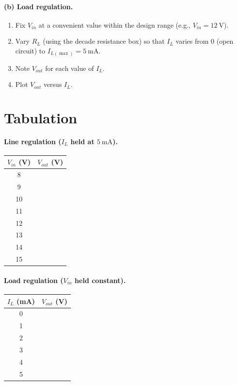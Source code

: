 \paragraph{(b) Load regulation.}
\begin{enumerate}
	\item Fix $V_{in}$ at a convenient value within the design range (e.g., $V_{in} = 12\ \text{V}$).
	\item Vary $R_L$ (using the decade resistance box) so that $I_L$ varies from $0$ (open circuit) to $I_{L(\max)} = 5\ \text{mA}$.
	\item Note $V_{out}$ for each value of $I_L$.
	\item Plot $V_{out}$ versus $I_L$.
\end{enumerate}

\section{Tabulation}

\paragraph{Line regulation ($I_L$ held at $5\ \text{mA}$).}
\begin{center}
	\begin{tabular}{@{}cc@{}}
		\toprule
		$V_{in}$ (V) & $V_{out}$ (V) \\
		\midrule
		8  & \\
		9  & \\
		10 & \\
		11 & \\
		12 & \\
		13 & \\
		14 & \\
		15 & \\
		\bottomrule
	\end{tabular}
\end{center}

\paragraph{Load regulation ($V_{in}$ held constant).}
\begin{center}
	\begin{tabular}{@{}cc@{}}
		\toprule
		$I_L$ (mA) & $V_{out}$ (V) \\
		\midrule
		0   & \\
		1   & \\
		2   & \\
		3   & \\
		4   & \\
		5   & \\
		\bottomrule
	\end{tabular}
\end{center}

